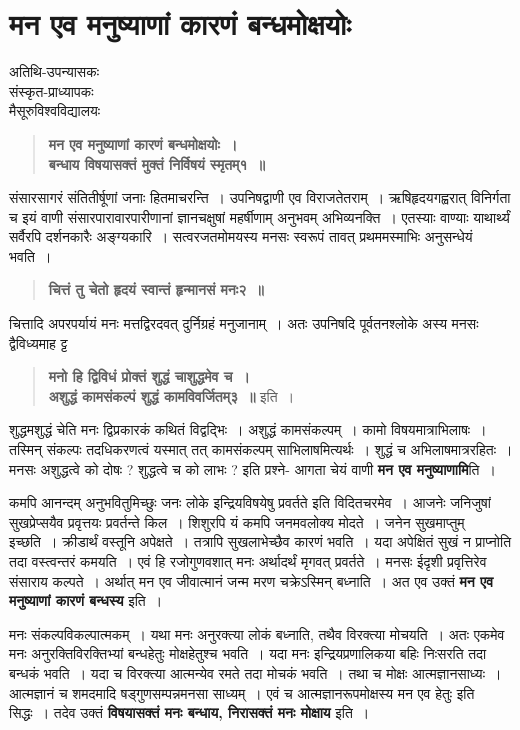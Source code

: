 {\fontsize{15}{17}\selectfont
\presetvalues
\chapter{मन एव मनुष्याणां कारणं बन्धमोक्षयोः }

\begin{center}
\smallskip
अतिथि-उपन्यासकः\\
संस्कृत-प्राध्यापकः\\
मैसूरुविश्वविद्यालयः
\addrule
\end{center}
\begin{verse}
\textbf{मन एव मनुष्याणां कारणं बन्धमोक्षयोः~। \\
बन्धाय विषयासक्तं मुक्तं निर्विषयं स्मृतम्१~॥}
\end{verse}
संसारसागरं संतितीर्षूणां जनाः हितमाचरन्ति~। उपनिषद्वाणी एव विराजतेतराम्~। ऋषिहृदयगह्वरात् विनिर्गता च इयं वाणी संसारपारावारपारीणानां ज्ञानचक्षुषां महर्षीणाम् अनुभवम् अभिव्यनक्ति~। एतस्याः वाण्याः याथार्थ्यं सर्वैरपि दर्शनकारैः अङ्ग्यकारि~। सत्वरजतमोमयस्य मनसः स्वरूपं तावत् प्रथममस्माभिः अनुसन्धेयं भवति~। 
\begin{verse}
\textbf{चित्तं तु चेतो हृदयं स्वान्तं हृन्मानसं मनः२~॥}
\end{verse}
चित्तादि अपरपर्यायं मनः मत्तद्विरदवत् दुर्निग्रहं मनुजानाम्~। अतः उपनिषदि पूर्वतनश्लोके अस्य मनसः द्वैविध्यमाह ट्ट 
\begin{verse}
\textbf{मनो हि द्विविधं प्रोक्तं शुद्धं चाशुद्धमेव च~। \\
अशुद्धं कामसंकल्पं शुद्धं कामविवर्जितम्३~॥} इति~। 
\end{verse}
शुद्धमशुद्धं चेति मनः द्विप्रकारकं कथितं विद्वद्भिः~। अशुद्धं कामसंकल्पम्~। कामो विषयमात्राभिलाषः~। तस्मिन् संकल्पः तदधिकरणत्वं यस्मात् तत् कामसंकल्पम् साभिलाषमित्यर्थः~। शुद्धं च अभिलाषमात्ररहितः~। मनसः अशुद्धत्वे को दोषः ? शुद्धत्वे च को लाभः ? इति प्रश्ने- आगता चेयं वाणी \textbf{मन एव मनुष्याणामि}ति~।   

कमपि आनन्दम् अनुभवितुमिच्छुः जनः लोके इन्द्रियविषयेषु प्रवर्तते इति विदितचरमेव~। आजनेः जनिजुषां सुखप्रेप्सयैव प्रवृत्तयः प्रवर्तन्ते किल~। शिशुरपि यं कमपि जनमवलोक्य मोदते~। जनेन सुखमाप्तुम् इच्छति~। क्रीडार्थं वस्तूनि अपेक्षते~। तत्रापि सुखलाभेच्छैव कारणं भवति~। यदा अपेक्षितं सुखं न प्राप्नोति तदा वस्त्वन्तरं कमयति~। एवं हि रजोगुणवशात् मनः अर्थादर्थं मृगवत् प्रवर्तते~। मनसः ईदृशी प्रवृत्तिरेव संसाराय कल्पते~। अर्थात् मन एव जीवात्मानं जन्म मरण चक्रेऽस्मिन् बध्नाति~। अत एव उक्तं \textbf{मन एव मनुष्याणां कारणं बन्धस्य} इति~। 

मनः संकल्पविकल्पात्मकम्~। यथा मनः अनुरक्त्या लोकं बध्नाति, तथैव विरक्त्या मोचयति~। अतः एकमेव मनः अनुरक्तिविरक्तिभ्यां बन्धहेतुः मोक्षहेतुश्च भवति~। यदा मनः इन्द्रियप्रणालिकया बहिः निःसरति तदा बन्धकं भवति~। यदा च विरक्त्या आत्मन्येव रमते तदा मोचकं भवति~। तथा च मोक्षः आत्मज्ञानसाध्यः~। आत्मज्ञानं च शमदमादि षड्गुणसम्पन्नमनसा साध्यम्~। एवं च आत्मज्ञानरूपमोक्षस्य मन एव हेतुः इति सिद्धः~। तदेव उक्तं \textbf{विषयासक्तं मनः बन्धाय, निरासक्तं मनः मोक्षाय} इति~। 

}
